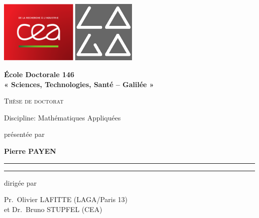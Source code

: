 \hypersetup{pageanchor=false}
\thispagestyle{empty}
\begin{titlepage}
\includegraphics[height = 3cm]{images/logo/CEA.pdf}
\hfill
\includegraphics[height = 3cm]{images/logo/laga.jpg}

\begin{center}
{\Large \textbf{École Doctorale 146 \\« Sciences, Technologies, Santé – Galilée »}}


{\Huge \textsc{Thèse de doctorat}}


{\LARGE Discipline: Mathématiques Appliquées}


{\large présentée par}

{
    \textbf{{\LARGE Pierre PAYEN}}\\
}

\hrule
{}
{\LARGE \textbf{\doctitlefr}}
\hrule

{\large dirigée par}

{
\large
    Pr.~Olivier LAFITTE (LAGA/Paris 13)\\
    et Dr.~Bruno STUPFEL (CEA)
}



\end{center}
\end{titlepage}
